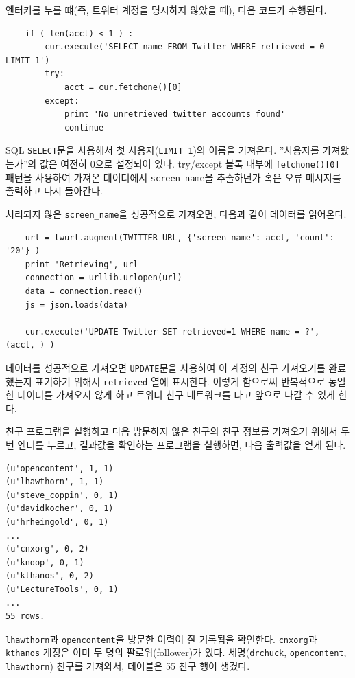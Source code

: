 엔터키를 누를 떄(즉, 트위터 계정을 명시하지 않았을 때), 다음 코드가 수행된다.

\beforeverb
\begin{verbatim}
    if ( len(acct) < 1 ) :
        cur.execute('SELECT name FROM Twitter WHERE retrieved = 0 LIMIT 1')
        try:
            acct = cur.fetchone()[0]
        except:
            print 'No unretrieved twitter accounts found'
            continue
\end{verbatim}
\afterverb
%

SQL {\tt SELECT}문을 사용해서 첫 사용자({\tt LIMIT 1})의 이름을 가져온다.
''사용자를 가져왔는가''의 값은 여전히 0으로 설정되어 있다.
try/except 블록 내부에 {\tt fetchone()[0]} 패턴을 사용하여 가져온 데이터에서 \verb"screen_name"을 
추출하던가 혹은 오류 메시지를 출력하고 다시 돌아간다.

처리되지 않은 \verb"screen_name"을 성공적으로 가져오면, 다음과 같이 데이터를 읽어온다.

\beforeverb
\begin{verbatim}
    url = twurl.augment(TWITTER_URL, {'screen_name': acct, 'count': '20'} )
    print 'Retrieving', url
    connection = urllib.urlopen(url)
    data = connection.read()
    js = json.loads(data)

    cur.execute('UPDATE Twitter SET retrieved=1 WHERE name = ?', (acct, ) )
\end{verbatim}
\afterverb
%

데이터를 성공적으로 가져오면 {\tt UPDATE}문을 사용하여 
이 계정의 친구 가져오기를 완료했는지 표기하기 위해서 {\tt retrieved} 열에 표시한다.
이렇게 함으로써 반복적으로 동일한 데이터를 가져오지 않게 하고 트위터 친구 네트워크를 타고 
앞으로 나갈 수 있게 한다.

친구 프로그램을 실행하고 다음 방문하지 않은 친구의 친구 정보를 가져오기 위해서
두번 엔터를 누르고, 결과값을 확인하는 프로그램을 실행하면, 다음 출력값을 얻게 된다.

\beforeverb
\begin{verbatim}
(u'opencontent', 1, 1)
(u'lhawthorn', 1, 1)
(u'steve_coppin', 0, 1)
(u'davidkocher', 0, 1)
(u'hrheingold', 0, 1)
...
(u'cnxorg', 0, 2)
(u'knoop', 0, 1)
(u'kthanos', 0, 2)
(u'LectureTools', 0, 1)
...
55 rows.
\end{verbatim}
\afterverb
%

{\tt lhawthorn}과 {\tt opencontent}을 방문한 이력이 잘 기록됨을 확인한다.
{\tt cnxorg}과 {\tt kthanos} 계정은 이미 두 명의 팔로워(follower)가 있다.
세명({\tt drchuck}, {\tt opencontent}, {\tt lhawthorn}) 친구를 가져와서, 테이블은 55 친구 행이 생겼다.

